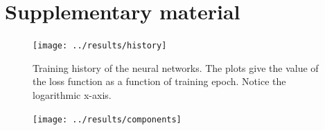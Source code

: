 \documentclass[preprint,5p]{elsarticle}
\begin{document}
\onecolumn
\appendix
\section{Supplementary material}

\begin{figure}[h]
	\centering
	\texttt{[image: ../results/history]}
	\caption{Training history of the neural networks. The plots give the value of the loss function as a function of training epoch. Notice the logarithmic x-axis.}
	\label{fig:history}
\end{figure}

\begin{figure}[h]
	\centering
	\texttt{[image: ../results/components]}
	\caption{}
	\label{fig:components}
\end{figure}
\end{document}
